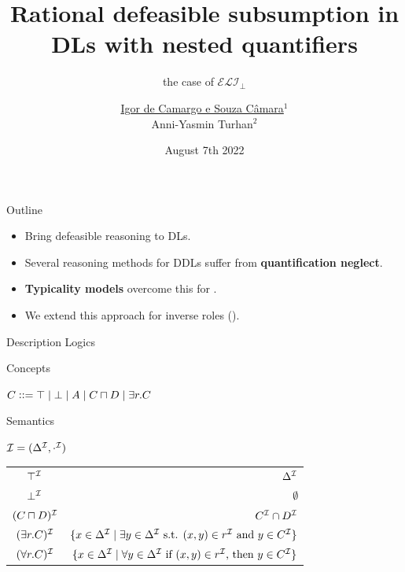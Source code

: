 \documentclass[10pt]{beamer}
\title{Rational defeasible subsumption in DLs with nested quantifiers}
\subtitle{the case of $\mathcal{ELI}_\bot$}
\date{August 7th 2022}
\author{\underline{Igor de Camargo e Souza Câmara$^{1}$} \\ Anni-Yasmin Turhan$^{2}$}
\institute{$^{1}$University of São Paulo \\ $^{2}$Dresden University of Technology }
\begin{document}
\begin{frame}[plain]
  \titlepage
\end{frame}

%
%

\begin{frame}[fragile] {Outline}

    \Large{
    \begin{itemize}
      \item  Bring defeasible reasoning to DLs.
      \item Several reasoning methods for DDLs suffer from \textbf{quantification neglect}.
      \item \textbf{Typicality models} overcome this for \ELbot.
      \item We extend this approach for inverse roles (\ELIbot).
    \end{itemize}
    }
\end{frame}

%
%

\begin{frame}[fragile]{Description Logics}

  \Large {
    Concepts
  }

{\large
  $C \mathrel{\mathop:}\mathrel{\mathop:}= \top \mid \bot \mid A \mid C\sqcap D \mid \exists r.C$
}
  \vspace{2mm}
    
    \Large{
      Semantics
    }

    \large{
    $\mathcal{I} = (\Delta^{\mathcal{I}}, \cdot^{\mathcal{I}})$
    }

    { \normalsize
    \begin{table}[ht]
      \begin{tabular}{c r}
       $\top^\mathcal{I}$ & $\Delta^\mathcal{I}$ \\ %
       $\bot^\mathcal{I}$ & $\emptyset$ \\ %
       $(C\sqcap D)^\mathcal{I}$ & $C^\mathcal{I}\cap D^\mathcal{I}$   \\ %
       $(\exists r.C)^\mathcal{I}$ & $\{x\in\Delta^\mathcal{I} \mid \exists y\in\Delta^\mathcal{I}\textrm{ s.t. }(x,y)\in r^\mathcal{I}\textrm{ and } y\in C^\mathcal{I}\}$    \\ %
       $(\forall r.C)^\mathcal{I}$ & $\{x\in\Delta^\mathcal{I} \mid \forall y\in\Delta^\mathcal{I}\textrm{ if }(x,y)\in r^\mathcal{I}\textrm{, then } y\in C^\mathcal{I}\}$  \\ %
      \end{tabular}
      \end{table}
    }
\end{frame}
\end{document}

